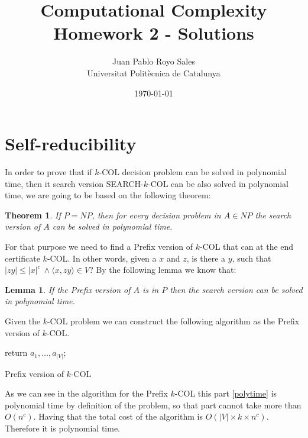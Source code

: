 \documentclass[12pt, a4paper]{article}
\title{%
  Computational Complexity \\
  Homework 2 - Solutions
}
\author{%
  Juan Pablo Royo Sales\\
  \small{Universitat Politècnica de Catalunya}
}
\date\today
\begin{document}
\maketitle

\section{Self-reducibility}

In order to prove that if $k$-COL decision problem can be solved in polynomial time, then it search version SEARCH-$k$-COL can be also solved in polynomial time, we are going to be based on the following theorem:

\newtheorem{searchpnp}{Theorem}
\begin{searchpnp}
  If $P = NP$, then for every decision problem in $A \in NP$ the search version of $A$ can be solved in polynomial time.
\end{searchpnp}

For that purpose we need to find a Prefix version of $k$-COL that can at the end certificate $k$-COL. In other words, given a $x$ and $z$, is there a $y$, such that $|zy| \leq |x|^c\ \land \langle x,zy \rangle \in V$?
By the following lemma we know that:

\newtheorem{lemmasearch}{Lemma}
\begin{lemmasearch}
  If the Prefix version of $A$ is in $P$ then the search version can be solved in polynomial time.
\end{lemmasearch}

Given the $k$-COL problem we can construct the following algorithm as the Prefix version of $k$-COL.

\begin{algorithm}[H]
  return $a_1,\dots,a_{|V|}$;
  \caption{Prefix version of $k$-COL}
\end{algorithm}

As we can see in the algorithm for the Prefix $k$-COL this part \ref{polytime} is polynomial time by definition of the problem, so that part cannot take more than $O(n^c)$. Having that the total cost of the algorithm is $O(|V| \times k \times n^c)$. Therefore it is polynomial time.
\end{document}
